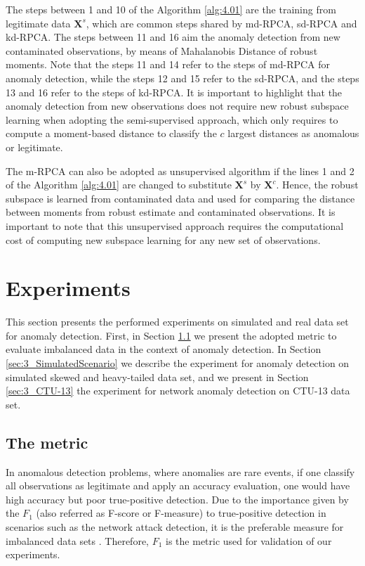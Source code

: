 The steps between 1 and 10 of the Algorithm \ref{alg:4.01} are the training from legitimate data $\pmb{X}^s$, which are common steps shared by md-RPCA, sd-RPCA and kd-RPCA. The steps between 11 and 16 aim the anomaly detection from new contaminated observations, by means of Mahalanobis Distance of robust moments. Note that the steps 11 and 14 refer to the steps of md-RPCA for anomaly detection, while the steps 12 and 15 refer to the sd-RPCA, and the steps 13 and 16 refer to the steps of kd-RPCA. It is important to highlight that the anomaly detection from new observations does not require new robust subspace learning when adopting the semi-supervised approach, which only requires to compute a moment-based distance to classify the $c$ largest distances as anomalous or legitimate.

The m-RPCA can also be adopted as unsupervised algorithm if the lines 1 and 2 of the Algorithm \ref{alg:4.01} are changed to substitute $\pmb{X}^s$ by $\pmb{X}^c$. Hence, the robust subspace is learned from contaminated data and used for comparing the distance between moments from robust estimate and contaminated observations. It is important to note that this unsupervised approach requires the computational cost of computing new subspace learning for any new set of observations.


\section{Experiments}
\label{sec:3_experiments}

This section presents the performed experiments on simulated and real data set for anomaly detection. First, in Section \ref{sec:3_metric} we present the adopted metric to evaluate imbalanced data in the context of anomaly detection. In Section \ref{sec:3_SimulatedScenario} we describe the experiment for anomaly detection on simulated skewed and heavy-tailed data set, and we present in Section \ref{sec:3_CTU-13} the experiment for network anomaly detection on CTU-13 data set.

\subsection{The metric}
\label{sec:3_metric}

In anomalous detection problems, where anomalies are rare events, if one classify all observations as legitimate and apply an accuracy evaluation, one would have high accuracy but poor true-positive detection. Due to the importance given by the $F_1$ (also referred as F-score or F-measure) to true-positive detection in scenarios such as the network attack detection, it is the preferable measure for imbalanced data sets \cite{powers2011evaluation,moustafa2019holistic}. Therefore, $F_1$ is the metric used for validation of our experiments.

